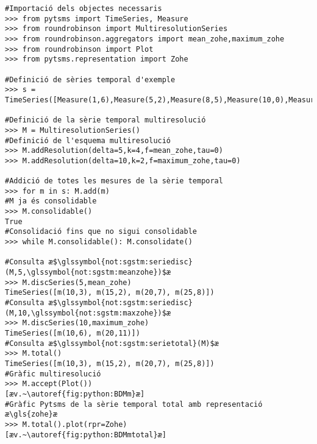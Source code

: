 \begin{lstlisting}[style=py,caption=Exemple d'operacions amb RoundRobinson,label=lst:roundrobinson:ex1]
#Importació dels objectes necessaris
>>> from pytsms import TimeSeries, Measure
>>> from roundrobinson import MultiresolutionSeries
>>> from roundrobinson.aggregators import mean_zohe,maximum_zohe
>>> from roundrobinson import Plot
>>> from pytsms.representation import Zohe

#Definició de sèries temporal d'exemple
>>> s = TimeSeries([Measure(1,6),Measure(5,2),Measure(8,5),Measure(10,0),Measure(14,1),Measure(19,6),Measure(22,11),Measure(26,6),Measure(29,0)])

#Definició de la sèrie temporal multiresolució
>>> M = MultiresolutionSeries()
#Definició de l'esquema multiresolució
>>> M.addResolution(delta=5,k=4,f=mean_zohe,tau=0)
>>> M.addResolution(delta=10,k=2,f=maximum_zohe,tau=0)

#Addició de totes les mesures de la sèrie temporal
>>> for m in s: M.add(m)
#M ja és consolidable
>>> M.consolidable()
True
#Consolidació fins que no sigui consolidable
>>> while M.consolidable(): M.consolidate()

#Consulta æ$\glssymbol{not:sgstm:seriedisc}(M,5,\glssymbol{not:sgstm:meanzohe})$æ
>>> M.discSeries(5,mean_zohe)
TimeSeries([m(10,3), m(15,2), m(20,7), m(25,8)])
#Consulta æ$\glssymbol{not:sgstm:seriedisc}(M,10,\glssymbol{not:sgstm:maxzohe})$æ
>>> M.discSeries(10,maximum_zohe)
TimeSeries([m(10,6), m(20,11)])
#Consulta æ$\glssymbol{not:sgstm:serietotal}(M)$æ
>>> M.total()
TimeSeries([m(10,3), m(15,2), m(20,7), m(25,8)])
#Gràfic multiresolució
>>> M.accept(Plot())
[æv.~\autoref{fig:python:BDMm}æ]
#Gràfic Pytsms de la sèrie temporal total amb representació æ\gls{zohe}æ
>>> M.total().plot(rpr=Zohe)
[æv.~\autoref{fig:python:BDMmtotal}æ]
\end{lstlisting}



